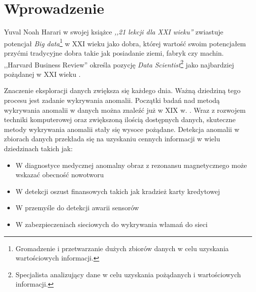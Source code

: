 \section{Wprowadzenie}
\label{sec:wprowadzenie}

Yuval Noah Harari w swojej książce \textit{,,21 lekcji dla XXI wieku''} zwiastuje potencjał \textit{Big data}\footnote{Gromadzenie i przetwarzanie dużych zbiorów danych w celu uzyskania wartościowych informacji.} w XXI wieku jako dobra, której wartość swoim potencjałem przyćmi tradycyjne dobra takie jak posiadanie ziemi, fabryk czy machin.
,,Harvard Business Review'' określa pozycję \textit{Data Scientist}\footnote{Specjalista analizujący dane w celu uzyskania pożądanych i wartościowych informacji.} jako najbardziej pożądanej w XXI wieku \cite{davenport2012data}. 

Znaczenie eksploracji danych zwiększa się każdego dnia.
Ważną dziedziną tego procesu jest zadanie wykrywania anomalii. Początki badań nad metodą wykrywania anomalii w danych można znaleźć już w XIX w. \cite{edgeworth1887xli}. 
Wraz z rozwojem techniki komputerowej oraz zwiększoną ilością dostępnych danych, skuteczne metody wykrywania anomalii stały się wysoce pożądane. 
Detekcja anomalii w zbiorach danych przekłada się na uzyskaniu cennych informacji w wielu dziedzinach takich jak:
\begin{itemize}
    \item W diagnostyce medycznej anomalny obraz z rezonansu magnetycznego może wskazać obecność nowotworu \cite{spence2001detection}
    \item W detekcji oszust finansowych takich jak kradzież karty kredytowej \cite{bolton2001unsupervised}
    \item W przemyśle do detekcji awarii sensorów \cite{dereszynski2011spatiotemporal} 
    \item W zabezpieczeniach sieciowych do wykrywania włamań do sieci \cite{garcia2009anomaly}
\end{itemize} 

